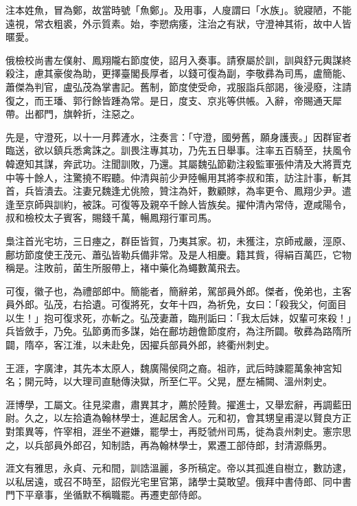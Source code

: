 \begin{pinyinscope}
 注本姓魚，冒為鄭，故當時號「魚鄭」。及用事，人廋謂曰「水族」。貌寢陋，不能遠視，常衣粗裘，外示質素。始，李愬病痿，注治之有狀，守澄神其術，故中人皆暱愛。



 俄檢校尚書左僕射、鳳翔隴右節度使，詔月入奏事。請寮屬於訓，訓與舒元輿謀終殺注，慮其豪俊為助，更擇臺閣長厚者，以錢可復為副，李敬彞為司馬，盧簡能、蕭傑為判官，盧弘茂為掌書記。舊制，節度使受命，戎服詣兵部謁，後浸廢，注請復之，而王璠、郭行餘皆踵為常。是日，度支、京兆等供帳。入辭，帝賜通天犀帶。出都門，旗幹折，注惡之。



 先是，守澄死，以十一月葬滻水，注奏言：「守澄，國勞舊，願身護喪。」因群宦者臨送，欲以鎮兵悉禽誅之。訓畏注專其功，乃先五日舉事。注率五百騎至，扶風令韓遼知其謀，奔武功。注聞訓敗，乃還。其屬魏弘節勸注殺監軍張仲清及大將賈克中等十餘人，注驚撓不暇聽。仲清與前少尹陸暢用其將李叔和策，訪注計事，斬其首，兵皆潰去。注妻兄魏逢尤佻險，贊注為奸，數顧賕，為率更令、鳳翔少尹。遣逢至京師與訓約，被誅。可復等及親卒千餘人皆族矣。擢仲清內常侍，遼咸陽令，叔和檢校太子賓客，賜錢千萬，暢鳳翔行軍司馬。



 梟注首光宅坊，三日瘞之，群臣皆賀，乃夷其家。初，未獲注，京師戒嚴，涇原、鄜坊節度使王茂元、蕭弘皆勒兵備非常。及是人相慶。籍其貲，得絹百萬匹，它物稱是。注敗前，菌生所服帶上，褚中藥化為蠅數萬飛去。



 可復，徽子也，為禮部郎中。簡能者，簡辭弟，駕部員外郎。傑者，俛弟也，主客員外郎。弘茂，右拾遺。可復將死，女年十四，為祈免，女曰：「殺我父，何面目以生！」抱可復求死，亦斬之。弘茂妻蕭，臨刑詬曰：「我太后妹，奴輩可來殺！」兵皆斂手，乃免。弘節勇而多謀，始在鄜坊趙儋節度府，為注所闢。敬彞為路隋所闢，隋卒，客江淮，以未赴免，因擢兵部員外郎，終衢州刺史。



 王涯，字廣津，其先本太原人，魏廣陽侯冏之裔。祖祚，武后時諫罷萬象神宮知名；開元時，以大理司直馳傳決獄，所至仁平。父晃，歷左補闕、溫州刺史。



 涯博學，工屬文。往見梁肅，肅異其才，薦於陸贄。擢進士，又舉宏辭，再調藍田尉。久之，以左拾遺為翰林學士，進起居舍人。元和初，會其甥皇甫湜以賢良方正對策異等，忤宰相，涯坐不避嫌，罷學士，再貶虢州司馬，徙為袁州刺史。憲宗思之，以兵部員外郎召，知制誥，再為翰林學士，累遷工部侍郎，封清源縣男。



 涯文有雅思，永貞、元和間，訓誥溫麗，多所稿定。帝以其孤進自樹立，數訪逮，以私居遠，或召不時至，詔假光宅里官第，諸學士莫敢望。俄拜中書侍郎、同中書門下平章事，坐循默不稱職罷。再遷吏部侍郎。




\end{pinyinscope}
